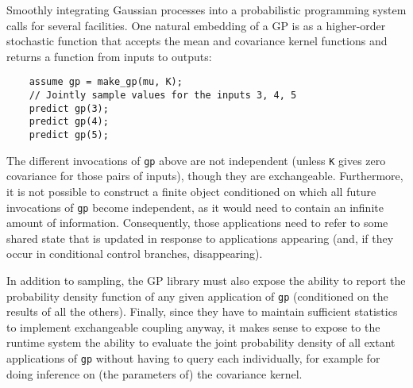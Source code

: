 % 
% 
% 
% 
% 
% 

Smoothly integrating Gaussian processes into a probabilistic
programming system calls for several facilities.  One natural
embedding of a \ac{GP} is as a higher-order stochastic function that
accepts the mean and covariance kernel functions and returns a
function from inputs to outputs:

    \begin{lstlisting}
    assume gp = make_gp(mu, K);
    // Jointly sample values for the inputs 3, 4, 5
    predict gp(3);
    predict gp(4);
    predict gp(5);
    \end{lstlisting}

The different invocations of \texttt{gp} above are not independent
(unless \texttt{K} gives zero covariance for those pairs of inputs),
though they are exchangeable.  Furthermore, it is not possible to
construct a finite object conditioned on which all future invocations
of \texttt{gp} become independent, as it would need to contain an
infinite amount of information.  Consequently, those applications need
to refer to some shared state that is updated in response to
applications appearing (and, if they occur in conditional control
branches, disappearing).

In addition to sampling, the \ac{GP} library must also expose the
ability to report the probability density function of any given
application of \texttt{gp} (conditioned on the results of all the
others).  Finally, since they have to maintain sufficient statistics
to implement exchangeable coupling anyway, it makes sense to expose to the runtime
system the ability to evaluate the joint probability density of all
extant applications of \texttt{gp} without having to query each
individually, for example for doing inference on (the parameters of)
the covariance kernel.

